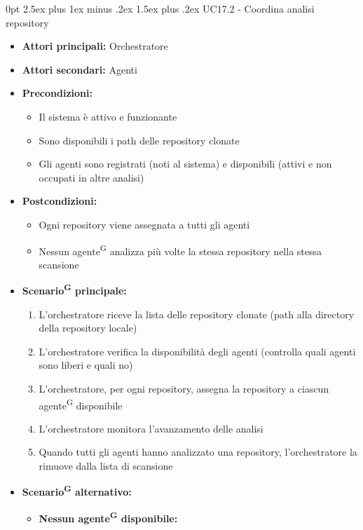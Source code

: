 \documentclass[a4paper, 11pt]{article}
\makeatletter
\renewcommand\paragraph{\@startsection{paragraph}{4}
  {0pt}
  {2.5ex plus 1ex minus .2ex}
  {1.5ex plus .2ex}
  {\normalfont\normalsize\bfseries\color{AccentDark}}}
\makeatother
\begin{document}
\paragraph{UC17.2 - Coordina analisi repository} \label{UC17.2}
\begin{itemize}
	\item \textbf{Attori principali:} Orchestratore
	\item \textbf{Attori secondari:} Agenti
	\item \textbf{Precondizioni:}
	\begin{itemize}
		\item Il sistema è attivo e funzionante
		\item Sono disponibili i path delle repository clonate
		\item Gli agenti sono registrati (noti al sistema) e disponibili (attivi e non occupati in altre analisi)
	\end{itemize}
	\item \textbf{Postcondizioni:}
	\begin{itemize}
		\item Ogni repository viene assegnata a tutti gli agenti
		\item Nessun agente\textsuperscript{G} analizza più volte la stessa repository nella stessa scansione
	\end{itemize}
	\item \textbf{Scenario\textsuperscript{G} principale:}
	\begin{enumerate}
		\item L'orchestratore riceve la lista delle repository clonate (path alla directory della repository locale)
		\item L'orchestratore verifica la disponibilità degli agenti (controlla quali agenti sono liberi e quali no)
		\item L'orchestratore, per ogni repository, assegna la repository a ciascun agente\textsuperscript{G} disponibile
		\item L'orchestratore monitora l'avanzamento delle analisi
		\item Quando tutti gli agenti hanno analizzato una repository, l'orchestratore la rimuove dalla lista di scansione
	\end{enumerate}
	\item \textbf{Scenario\textsuperscript{G} alternativo:}
	\begin{itemize}
		\item \textbf{Nessun agente\textsuperscript{G} disponibile:}
			\begin{itemize}

\end{itemize}
\end{itemize}
\end{itemize}
\end{document}
